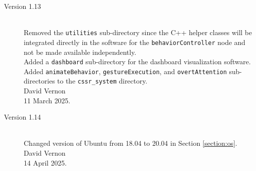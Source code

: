 \documentclass{CSSRforAfrica}
\begin{document}
\begin{description}
\item [Version 1.13]~\\
Removed  the {\small \tt utilities} sub-directory since the C++ helper classes will be integrated directly in the software for the {\small \tt behaviorController} node and not be made available independently.\\
Added a  {\small \tt dashboard} sub-directory for the dashboard visualization software.\\
Added {\small \tt animateBehavior}, {\small \tt gestureExecution}, and {\small \tt overtAttention} sub-directories to the  {\small \tt cssr\_system} directory.\\
David Vernon \\       
11 March 2025.

\item [Version 1.14]~\\
Changed version of Ubuntu from 18.04 to 20.04 in Section \ref{section:os}.\\
David Vernon \\       
14 April 2025.
 
\end{description}
\end{document}
